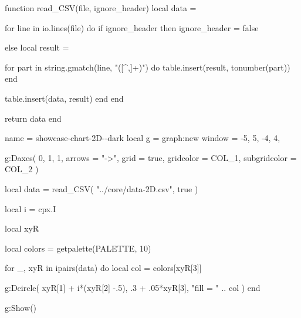 
\vfill

\begin{luacode*}
function read_CSV(file, ignore_header)
  local data = {}

  for line in io.lines(file) do
    if ignore_header then
      ignore_header = false

    else
      local result = {}

      for part in string.gmatch(line, "([^,]+)") do
        table.insert(result, tonumber(part))
      end

      table.insert(data, result)
    end
  end

  return data
end
\end{luacode*}


\begin{luadraw}{name = showcase-chart-2D-\PALETTE-dark}
local g = graph:new{
  window = {-5, 5, -4, 4},
}

g:Daxes(
  {0, 1, 1},
  {
    arrows       = "->",
    grid         = true,
    gridcolor    = COL_1,
    subgridcolor = COL_2
  }
)

local data = read_CSV(
  "../core/data-2D.csv",
  true
)

local i = cpx.I

local xyR

local colors = getpalette(PALETTE, 10)

for _, xyR in ipairs(data) do
  local col = colors[xyR[3]]

  g:Dcircle(
    xyR[1] + i*(xyR[2] -.5), .3 + .05*xyR[3],
    "fill = " .. col
  )
end

g:Show()
\end{luadraw}
